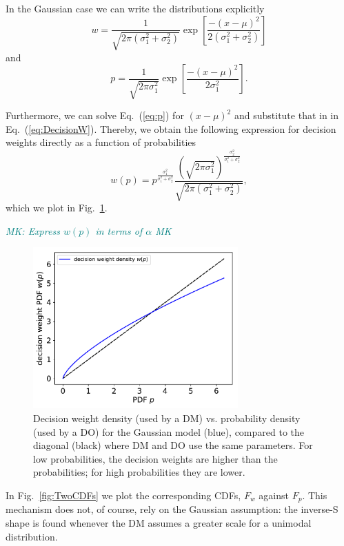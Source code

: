 \documentclass[%
	11pt,
	abstract=true,	
	bibliography=oldstyle					%
]{scrartcl}
\newcommand{\elabel}[1]{\label{eq:#1}}
\newcommand{\eref}[1]{Eq.~(\ref{eq:#1})}
\newcommand{\flabel}[1]{\label{fig:#1}}
\newcommand{\fref}[1]{Fig.~\ref{fig:#1}}
\newcommand{\teal}[1]{\textcolor{teal}{#1}}
\newcommand{\MK}[1]{\teal{\textit{MK: #1 MK}}}
\newcommand{\be}{\begin{equation}}
\newcommand{\ee}{\end{equation}}
\numberwithin{equation}{section}
\begin{document}

In the Gaussian case we can write the distributions explicitly
\be \elabel{DecisionW}
	w=\frac{1}{\sqrt{2\pi (\sigma_1^2+\sigma_2^2)}}\exp\left[\frac{-(x -\mu )^2}{2 (\sigma_1^2+\sigma_2^2)}\right]
\ee
and
\be
	p=\frac{1}{\sqrt{2\pi \sigma_1^2}}\exp\left[\frac{-(x -\mu )^2}{2 \sigma_1^2}\right].
\elabel{p}
\ee

Furthermore, we can solve \eref{p} for $(x -\mu )^2$ and substitute that in in \eref{DecisionW}. Thereby, we obtain the following expression for decision weights directly as a function of probabilities
\be
w(p)=p^{\frac{\sigma_1^2}{\sigma_1^2+\sigma_2^2}} \frac{\left(\sqrt{2\pi\sigma_1^2}\right)^{\frac{\sigma_2^2}{\sigma_1^2+\sigma_2^2}}}{\sqrt{2\pi(\sigma_1^2+\sigma_2^2)}},
\elabel{q_of_p}
\ee
which we plot in \fref{probability_weights}. 

\MK{Express $w(p)$ in terms of $\alpha$}


\begin{figure}[!htb]
\centering
\includegraphics[width=0.7\textwidth]{./figs/decision_weights.pdf}
\caption{Decision weight density (used by a DM) vs. probability density (used by a DO) for the Gaussian model (blue), compared to the diagonal (black) where DM and DO use the same parameters. For low probabilities, the decision weights are higher than the probabilities; for high probabilities they are lower.}
\flabel{probability_weights}
\end{figure}

In \fref{TwoCDFs} we plot the corresponding CDFs, $F_w$ against $F_p$. 
This mechanism does not, of course, rely on the Gaussian assumption: the inverse-S shape is found whenever the DM assumes a greater scale for a unimodal distribution.
\end{document}
